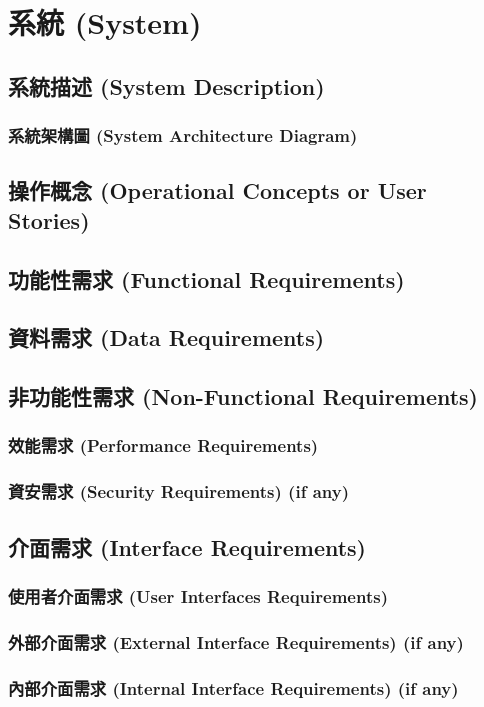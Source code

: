 \documentclass[a4paper, 12pt]{article}
\begin{document}
\section{系統 (System)}
\subsection{系統描述 (System Description)}
\subsubsection{系統架構圖 (System Architecture Diagram) }
\subsection{操作概念 (Operational Concepts or User Stories)}
\subsection{功能性需求 (Functional Requirements)}
\subsection{資料需求 (Data Requirements)}
\subsection{非功能性需求 (Non-Functional Requirements)}
\subsubsection{效能需求 (Performance Requirements)}
\subsubsection{資安需求 (Security Requirements) (if any)}
\subsection{介面需求 (Interface Requirements)}
\subsubsection{使用者介面需求 (User Interfaces Requirements)}
\subsubsection{外部介面需求 (External Interface Requirements) (if any)}
\subsubsection{內部介面需求 (Internal Interface Requirements) (if any)}
\end{document}

